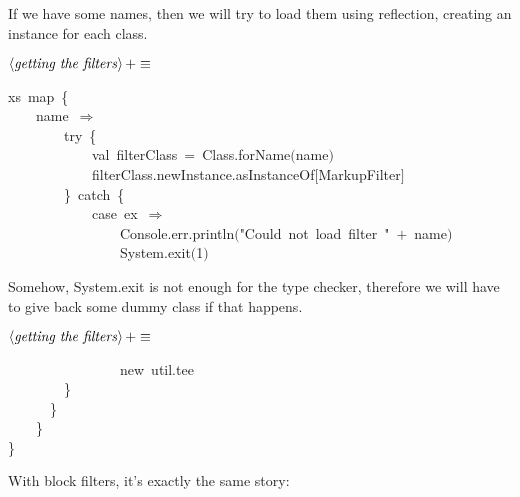 \documentclass[a4paper,12pt]{article}
\begin{document}
If we have some names, then we will try to load them using reflection,
creating an instance for each class.

$\left<\mbox{\emph{getting the filters}}\right>+\equiv$
\begin{program}xs~map~{\small\{}
\\~~~~name~$\Rightarrow$
\\~~~~~~~~{\vem try}~{\small\{}
\\~~~~~~~~~~~~{\vem val}~filterClass~=~Class.forName$($name$)$
\\~~~~~~~~~~~~filterClass.newInstance.asInstanceOf$[$MarkupFilter$]$
\\~~~~~~~~{\small\}}~{\vem catch}~{\small\{}
\\~~~~~~~~~~~~{\vem case}~ex~$\Rightarrow$
\\~~~~~~~~~~~~~~~~Console.err.println$($"Could~not~load~filter~"~$+$~name$)$
\\~~~~~~~~~~~~~~~~System.exit$($1$)$
\end{program}


Somehow, System.exit is not enough for the type checker, therefore we will
have to give back some dummy class if that happens.

$\left<\mbox{\emph{getting the filters}}\right>+\equiv$
\begin{program}~~~~~~~~~~~~~~~~{\vem new}~util.tee
\\~~~~~~~~{\small\}}
\\~~~~~~{\small\}}
\\~~~~{\small\}}
\\{\small\}}
\\[0.5em]\end{program}


With block filters, it's exactly the same story:
\end{document}
